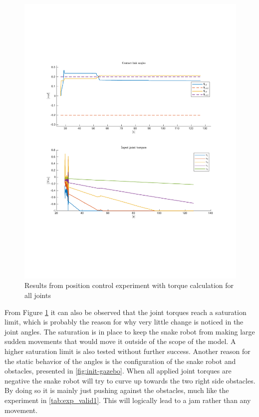 \begin{figure}[H]
    \centering
    \includegraphics[trim=2.1cm 6cm 2.1cm 5cm, clip=true, width=\textwidth]{figures/experiments/2xpos/2xpos-2plot-fail.pdf}
    \caption{Results from position control experiment with torque calculation for all joints}
    \label{fig:2xp-1}
\end{figure}

From Figure \ref{fig:2xp-1} it can also be observed that the joint torques reach a saturation limit, which is probably the reason for why very little change is noticed in the joint angles. The saturation is in place to keep the snake robot from making large sudden movements that would move it outside of the scope of the model. A higher saturation limit is also tested without further success. Another reason for the static behavior of the angles is the configuration of the snake robot and obstacles, presented in \ref{fig:init-gazebo}. When all applied joint torques are negative the snake robot will try to curve up towards the two right side obstacles. By doing so it is mainly just pushing against the obstacles, much like the experiment in \ref{tab:exp_valid1}. This will logically lead to a jam rather than any movement.

